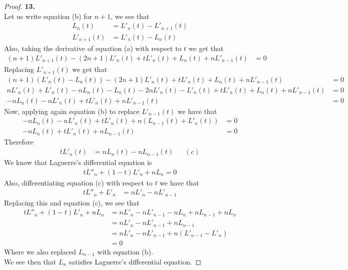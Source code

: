 \documentclass[11pt]{article}
\theoremstyle{definition}
\begin{document}
\cleardoublepage
\begin{proof}{\textbf{13.}}\\
Let us write equation (b) for $n + 1$, we see that
\begin{align*}
    L_n(t) &= L'_n(t) - L'_{n+1}(t)\\
    L'_{n+1}(t) &= L'_n(t) - L_{n}(t)
\end{align*}
Also, taking the derivative of equation (a) with respect to $t$ we get that
\begin{align*}
    (n+1)L'_{n+1}(t) - (2n + 1)L'_n(t) + tL'_n(t) + L_n(t) + nL'_{n-1}(t) &= 0
\end{align*}
Replacing $L'_{n+1}(t)$ we get that
\begin{align*}
    (n+1)(L'_{n}(t) - L_n(t)) - (2n + 1)L'_n(t) + tL'_n(t)
    + L_n(t) + nL'_{n-1}(t) &= 0 \\
    nL'_{n}(t) + L'_{n}(t) - nL_n(t) - L_n(t) - 2nL'_n(t) - L'_n(t) + tL'_n(t)
    + L_n(t) + nL'_{n-1}(t) &= 0 \\
    - nL_n(t) - nL'_n(t) + tL'_n(t) + nL'_{n-1}(t) &= 0
\end{align*}
Now, applying again equation (b) to replace $L'_{n-1}(t)$ we have that
\begin{align*}
    - nL_n(t) - nL'_n(t) + tL'_n(t) + n(L_{n-1}(t) + L'_n(t)) &= 0 \\
    - nL_n(t)  + tL'_n(t) + nL_{n-1}(t) &= 0
\end{align*}
Therefore
\begin{align*}
    tL'_n(t) &= nL_n(t) - nL_{n-1}(t) &  &(c)
\end{align*}
We know that Laguerre's differential equation is 
\begin{align*}
    tL''_{n} + (1 - t)L'_n + nL_n = 0
\end{align*}
Also, differentiating equation (c) with respect to $t$ we have that
\begin{align*}
    tL''_n + L'_n &= nL'_n - nL'_{n-1}
\end{align*}
Replacing this and equation (c), we see that
\begin{align*}
    tL''_{n} + (1 - t)L'_n + nL_n 
    &= nL'_n - nL'_{n-1} - nL_n + nL_{n-1} + nL_n\\
    &= nL'_n - nL'_{n-1} + nL_{n-1}\\
    &= nL'_n - nL'_{n-1} + n(L'_{n-1} - L'_n)\\
    &= 0
\end{align*}
Where we also replaced $L_{n-1}$ with equation (b).\\
We see then that $L_n$ satisfies Laguerre's differential equation.
\end{proof}
\end{document}
